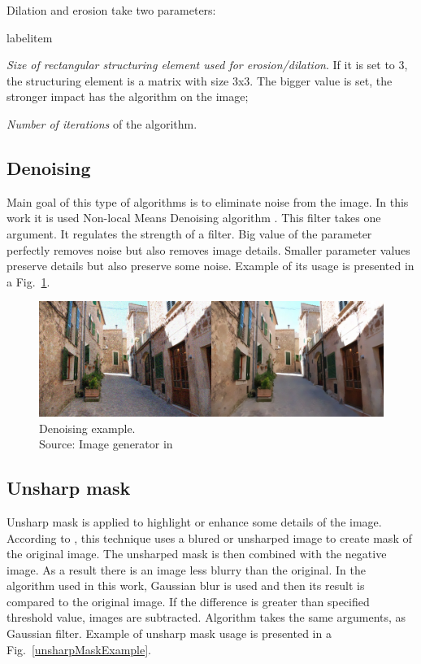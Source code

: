\documentclass[a4paper,onecolumn,oneside,12pt]{memoir}
\makeatletter
\renewenvironment{itemize}{
  \begin{list}{  
  \csname labelitem\romannumeral\the\@listdepth\endcsname}{
  \setlength{\leftmargin}{1em}
	\setlength{\topsep}{6pt}%
	\setlength{\partopsep}{0pt}%
	\setlength{\parskip}{0pt}%
	\setlength{\parsep}{0pt}%
	\setlength{\itemsep}{0pt}}
}{
  \end{list}
}
\makeatother
\begin{document}
Dilation and erosion take two parameters:

\begin{itemize}
  \item \textit{Size of rectangular structuring element used for erosion/dilation}. If it is set to
        3, the structuring element is a matrix with size 3x3. The bigger value is set, the stronger
        impact has the algorithm on the image;
  \item \textit{Number of iterations} of the algorithm.
\end{itemize}

\subsection{Denoising}

Main goal of this type of algorithms is to eliminate noise from the image. In this work it is used 
Non-local Means Denoising algorithm \cite{nonLocalMeansDenoising}. This filter takes one argument.
It regulates the strength of a filter. Big value of the parameter perfectly removes noise but also
removes image details. Smaller parameter values preserve details but also preserve some noise.
Example of its usage is presented in a Fig.~\ref{denoisingExample}.

\begin{figure}[ht]
\begin{center}
\includegraphics[scale=0.3]{images/denoisingExample.jpg}
\caption{Denoising example. \\
Source: Image generator in \cite{nonLocalMeansDenoising}}
\label{denoisingExample}
\end{center}
\end{figure}

\subsection{Unsharp mask}

Unsharp mask is applied to highlight or enhance some details of the image. According to 
\cite{unsharpMaskWiki}, this technique uses a blured or unsharped image to create mask of the
original image. The unsharped mask is then combined with the negative image. As a result there is an
image less blurry than the original. In the algorithm used in this work, Gaussian blur is used and
then its result is compared to the original image. If the difference is greater than specified
threshold value, images are subtracted. Algorithm takes the same arguments, as Gaussian filter.
Example of unsharp mask usage is presented in a Fig.~\ref{unsharpMaskExample}.
\end{document}
